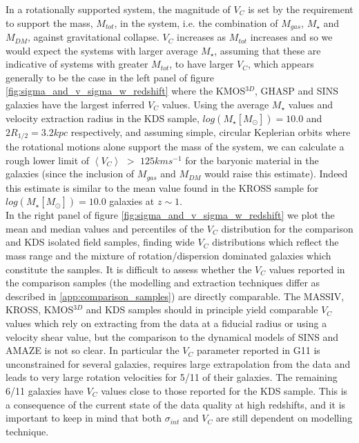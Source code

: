 \documentclass[fleqn,usenatbib]{mn2e}
\begin{document}
In a rotationally supported system, the magnitude of $V_{C}$ is set by the requirement to support the mass, $M_{tot}$, in the system, i.e. the combination of $M_{gas}$, $M_{\star}$ and $M_{DM}$, against gravitational collapse.
$V_{C}$ increases as $M_{tot}$ increases and so we would expect the systems with larger average $M_{\star}$, assuming that these are indicative of systems with greater $M_{tot}$, to have larger $V_{C}$, which appears generally to be the case in the left panel of figure \ref{fig:sigma_and_v_sigma_w_redshift} where the KMOS$^{3D}$, GHASP and SINS galaxies have the largest inferred $V_{C}$ values.
Using the average $M_{\star}$ values and velocity extraction radius in the KDS sample, $log(M_{\star}[M_{\odot}])=10.0$ and $2R_{1/2} = 3.2kpc$ respectively, and assuming simple, circular Keplerian orbits where the rotational motions alone support the mass of the system, we can calculate a rough lower limit of $\left<V_{C}\right>$ $>$ $125kms^{-1}$ for the baryonic material in the galaxies (since the inclusion of $M_{gas}$ and $M_{DM}$ would raise this estimate).
Indeed this estimate is similar to the mean value found in the KROSS sample for $log(M_{\star}[M_{\odot}])=10.0$ galaxies at $z\sim1$. \\


In the right panel of figure \ref{fig:sigma_and_v_sigma_w_redshift} we plot the mean and median values and percentiles of the $V_{C}$ distribution for the comparison and KDS isolated field samples, finding wide $V_{C}$ distributions which reflect the mass range and the mixture of rotation/dispersion dominated galaxies which constitute the samples.
It is difficult to assess whether the $V_{C}$ values reported in the comparison samples (the modelling and extraction techniques differ as described in \cref{app:comparison_samples}) are directly comparable.
The MASSIV, KROSS, KMOS$^{3D}$ and KDS samples should in principle yield comparable $V_{C}$ values which rely on extracting from the data at a fiducial radius or using a velocity shear value, but the comparison to the dynamical models of SINS and AMAZE is not so clear.
In particular the $V_{C}$ parameter reported in G11 is unconstrained for several galaxies, requires large extrapolation from the data and leads to very large rotation velocities for 5/11 of their galaxies.
The remaining 6/11 galaxies have $V_{C}$ values close to those reported for the KDS sample.
This is a consequence of the current state of the data quality at high redshifts, and it is important to keep in mind that both $\sigma_{int}$ and $V_{C}$ are still dependent on modelling technique. \\
\end{document}
